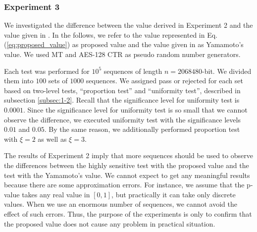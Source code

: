 \documentclass[dvipdfmx,english]{ampmt} %
\begin{document}
\subsubsection{Experiment 3}
We investigated the difference between the value derived in Experiment 2 and the value given in \cite{yamamoto2016highly}. In the follows, we refer to the value represented in Eq. (\ref{eq:proposed_value}) as proposed value and the value given in \cite{yamamoto2016highly} as Yamamoto's value. We used MT \cite{matsumoto1998mersenne} and AES-128 CTR \cite{rijmen2001advanced} as pseudo random number generators. 
\par
Each test was performed for $10^5$ sequences of length $n=2068480$-bit. We divided them into $100$ sets of $1000$ sequences. We assigned pass or rejected for each set based on two-level tests, ``proportion test'' and ``uniformity test'', described in subsection \ref{subsec:1-2}.
%
Recall that the significance level for uniformity test is $0.0001$. 
Since the significance level for uniformity test is so small that we cannot observe the difference, we executed uniformity test with the significance levels $0.01$ and $0.05$.
By the same reason, we additionally performed proportion test with $\xi=2$ as well as $\xi=3$.
\par
The results of Experiment 2 imply that more sequences should be used to observe the differences between the highly sensitive test with the proposed value and the test with the Yamamoto's value. We cannot expect to get any meaningful results because there are some approximation errors. For instance, we assume that the p-value takes any real value in $[0,1]$, but practically it can take only discrete values. When we use an enormous number of sequences, we cannot avoid the effect of such errors.
%
Thus, the purpose of the experiments is only to confirm that the proposed value does not cause any problem in practical situation.
\par
\end{document}
